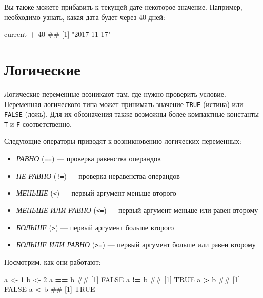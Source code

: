 \documentclass[]{book}
\newenvironment{Shaded}{\begin{snugshade}}{\end{snugshade}}
\newcommand{\DecValTok}[1]{\textcolor[rgb]{0.00,0.00,0.81}{#1}}
\newcommand{\StringTok}[1]{\textcolor[rgb]{0.31,0.60,0.02}{#1}}
\newcommand{\OperatorTok}[1]{\textcolor[rgb]{0.81,0.36,0.00}{\textbf{#1}}}
\newcommand{\NormalTok}[1]{#1}
\providecommand{\tightlist}{%
  \setlength{\itemsep}{0pt}\setlength{\parskip}{0pt}}
\begin{document}
Вы также можете прибавить к текущей дате некоторое значение. Например,
необходимо узнать, какая дата будет через 40 дней:

\begin{Shaded}
\begin{Highlighting}[]
\NormalTok{current }\OperatorTok{+}\StringTok{ }\DecValTok{40}
\NormalTok{## [1] "2017-11-17"}
\end{Highlighting}
\end{Shaded}

\section{Логические}\label{booleans}

Логические переменные возникают там, где нужно проверить условие.
Переменная логического типа может принимать значение \texttt{TRUE}
(истина) или \texttt{FALSE} (ложь). Для их обозначения также возможны
более компактные константы \texttt{T} и \texttt{F} соответственно.

Следующие операторы приводят к возникновению логических переменных:

\begin{itemize}
\tightlist
\item
  \emph{РАВНО} (\texttt{==}) --- проверка равенства операндов
\item
  \emph{НЕ РАВНО} (\texttt{!=}) --- проверка неравенства операндов
\item
  \emph{МЕНЬШЕ} (\texttt{\textless{}}) --- первый аргумент меньше
  второго
\item
  \emph{МЕНЬШЕ ИЛИ РАВНО} (\texttt{\textless{}=}) --- первый аргумент
  меньше или равен второму
\item
  \emph{БОЛЬШЕ} (\texttt{\textgreater{}}) --- первый аргумент больше
  второго
\item
  \emph{БОЛЬШЕ ИЛИ РАВНО} (\texttt{\textgreater{}=}) --- первый аргумент
  больше или равен второму
\end{itemize}

Посмотрим, как они работают:

\begin{Shaded}
\begin{Highlighting}[]
\NormalTok{a <-}\StringTok{ }\DecValTok{1}
\NormalTok{b <-}\StringTok{ }\DecValTok{2}
\NormalTok{a }\OperatorTok{==}\StringTok{ }\NormalTok{b}
\NormalTok{## [1] FALSE}
\NormalTok{a }\OperatorTok{!=}\StringTok{ }\NormalTok{b}
\NormalTok{## [1] TRUE}
\NormalTok{a }\OperatorTok{>}\StringTok{ }\NormalTok{b}
\NormalTok{## [1] FALSE}
\NormalTok{a }\OperatorTok{<}\StringTok{ }\NormalTok{b}
\NormalTok{## [1] TRUE}
\end{Highlighting}
\end{Shaded}
\end{document}
